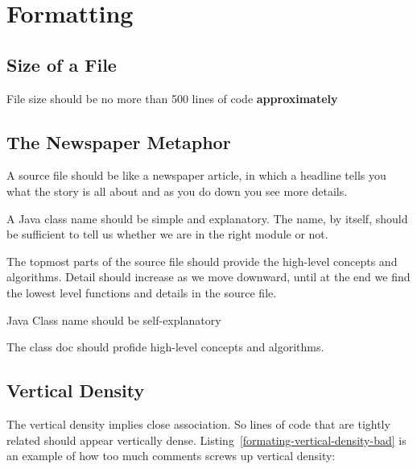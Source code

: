 
\chapter{Formatting}

\section{Size of a File}

File size should be no more than 500 lines of code \textbf{approximately}

\section{The Newspaper Metaphor}

A source file should be like a newspaper article, in which a headline tells you what the story is all about and as you do down you see more details.

A Java class name should be simple and explanatory. The name, by itself, should be sufficient to tell us whether we are in the right module or not.

The topmost parts of the source file should provide the high-level concepts and algorithms. Detail should increase as we move downward, until at the end
we find the lowest level functions and details in the source file.

\begin{marker}
Java Class name should be self-explanatory

The class doc should profide high-level concepts and algorithms.
\end{marker}

\section{Vertical Density}

The vertical density implies close association. So lines of code that are tightly related should appear vertically dense. Listing~\ref{formating-vertical-density-bad} is an example of how too much comments screws up vertical density: 

